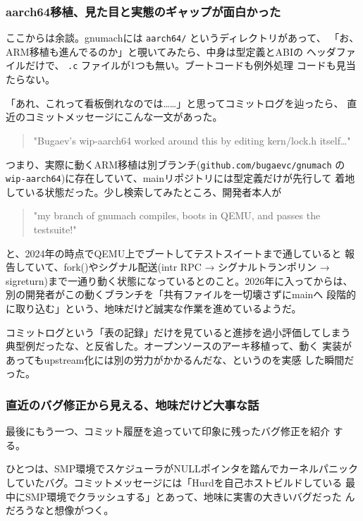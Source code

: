 \documentclass[11pt]{article}
\begin{document}
\subsubsection{aarch64移植、見た目と実態のギャップが面白かった}
\label{sec:orgaa5cda7}

ここからは余談。gnumachには \texttt{aarch64/} というディレクトリがあって、
「お、ARM移植も進んでるのか」と覗いてみたら、中身は型定義とABIの
ヘッダファイルだけで、 \texttt{.c} ファイルが1つも無い。ブートコードも例外処理
コードも見当たらない。

「あれ、これって看板倒れなのでは……」と思ってコミットログを辿ったら、
直近のコミットメッセージにこんな一文があった。

\begin{quote}
"Bugaev's wip-aarch64 worked around this by editing kern/lock.h itself\ldots{}"
\end{quote}

つまり、実際に動くARM移植は別ブランチ(\texttt{github.com/bugaevc/gnumach} の
\texttt{wip-aarch64})に存在していて、mainリポジトリには型定義だけが先行して
着地している状態だった。少し検索してみたところ、開発者本人が

\begin{quote}
"my branch of gnumach compiles, boots in QEMU, and passes the testsuite!"
\end{quote}

と、2024年の時点でQEMU上でブートしてテストスイートまで通していると
報告していて、fork()やシグナル配送(intr RPC → シグナルトランポリン →
sigreturn)まで一通り動く状態になっているとのこと。2026年に入ってからは、
別の開発者がこの動くブランチを「共有ファイルを一切壊さずにmainへ
段階的に取り込む」という、地味だけど誠実な作業を進めているようだ。

コミットログという「表の記録」だけを見ていると進捗を過小評価してしまう
典型例だったな、と反省した。オープンソースのアーキ移植って、動く
実装があってもupstream化には別の労力がかかるんだな、というのを実感
した瞬間だった。
\subsubsection{直近のバグ修正から見える、地味だけど大事な話}
\label{sec:orgd9db471}

最後にもう一つ、コミット履歴を追っていて印象に残ったバグ修正を紹介
する。

ひとつは、SMP環境でスケジューラがNULLポインタを踏んでカーネルパニック
していたバグ。コミットメッセージには「Hurdを自己ホストビルドしている
最中にSMP環境でクラッシュする」とあって、地味に実害の大きいバグだった
んだろうなと想像がつく。
\end{document}
